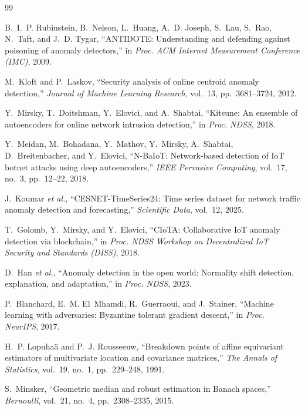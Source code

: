 \begin{thebibliography}{99}

 B.~I.~P. Rubinstein, B.~Nelson, L.~Huang, A.~D. Joseph, S.~Lau, S.~Rao, N.~Taft, and
J.~D. Tygar, ``ANTIDOTE: Understanding and defending against poisoning of anomaly detectors,'' in
\emph{Proc. ACM Internet Measurement Conference (IMC)}, 2009.

 M.~Kloft and P.~Laskov, ``Security analysis of online centroid anomaly detection,''
\emph{Journal of Machine Learning Research}, vol.~13, pp.~3681--3724, 2012.

 Y.~Mirsky, T.~Doitshman, Y.~Elovici, and A.~Shabtai, ``Kitsune: An ensemble of
autoencoders for online network intrusion detection,'' in \emph{Proc. NDSS}, 2018.

 Y.~Meidan, M.~Bohadana, Y.~Mathov, Y.~Mirsky, A.~Shabtai, D.~Breitenbacher, and
Y.~Elovici, ``N-BaIoT: Network-based detection of IoT botnet attacks using deep autoencoders,''
\emph{IEEE Pervasive Computing}, vol.~17, no.~3, pp.~12--22, 2018.

 J.~Koumar \emph{et al.}, ``CESNET-TimeSeries24: Time series dataset for network
traffic anomaly detection and forecasting,'' \emph{Scientific Data}, vol.~12, 2025.

 T.~Golomb, Y.~Mirsky, and Y.~Elovici, ``CIoTA: Collaborative IoT anomaly detection via
blockchain,'' in \emph{Proc. NDSS Workshop on Decentralized IoT Security and Standards (DISS)}, 2018.

 D.~Han \emph{et al.}, ``Anomaly detection in the open world: Normality shift detection,
explanation, and adaptation,'' in \emph{Proc. NDSS}, 2023.

 P.~Blanchard, E.~M. El~Mhamdi, R.~Guerraoui, and J.~Stainer, ``Machine learning with
adversaries: Byzantine tolerant gradient descent,'' in \emph{Proc. NeurIPS}, 2017.

 H.~P. Lopuha{\"a} and P.~J. Rousseeuw, ``Breakdown points of affine equivariant
estimators of multivariate location and covariance matrices,'' \emph{The Annals of Statistics},
vol.~19, no.~1, pp.~229--248, 1991.

 S.~Minsker, ``Geometric median and robust estimation in Banach spaces,''
\emph{Bernoulli}, vol.~21, no.~4, pp.~2308--2335, 2015.


\end{thebibliography}
